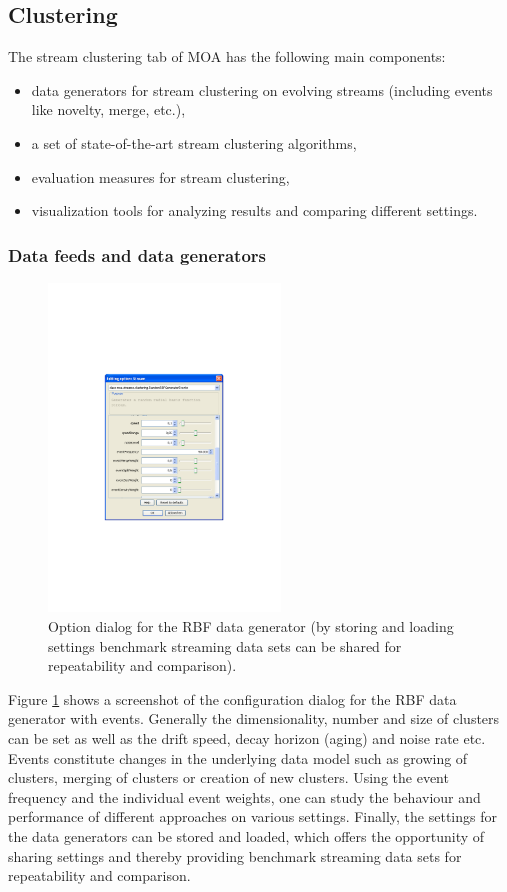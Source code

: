 \documentclass[a4paper,12pt,twoside]{book}
\begin{document}
\subsection{Clustering}

The stream clustering tab of MOA has the following main components:
\begin{itemize}
	\item data generators for stream clustering on evolving streams (including events like novelty, merge, etc.),
	\item a set of state-of-the-art stream clustering algorithms,
	\item evaluation measures for stream clustering,
	\item visualization tools for analyzing results and comparing different settings.
\end{itemize}

\subsubsection{Data feeds and data generators}
\label{sec:generators}

\begin{figure}[t]
	\centering
		\includegraphics[width=0.55\textwidth]{figures/SetupTab}
	\caption{Option dialog for the RBF data generator (by storing and loading settings benchmark streaming data sets can be shared for repeatability and comparison).}
	\label{fig:framework}
\end{figure}
Figure \ref{fig:framework} shows a screenshot of the configuration dialog for the RBF data generator with events. 
Generally the dimensionality, number and size of clusters can be set as well as the drift speed, decay horizon (aging) and noise rate etc.
 Events constitute changes in the underlying data model such as growing of clusters, merging of clusters or creation of new clusters. 
Using the event frequency and the individual event weights, one can study the behaviour and performance of different approaches on various settings. 
Finally, the settings for the data generators can be stored and loaded, which offers the opportunity of sharing settings and thereby providing benchmark streaming data 
sets for repeatability and comparison. 
\end{document}
